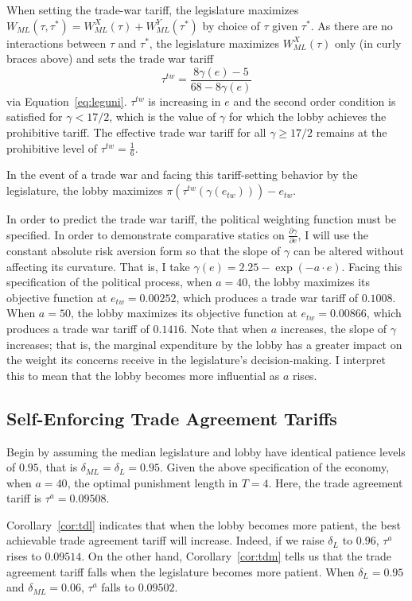 \documentclass[authoryear, review]{elsarticle}
\newcommand{\ga}{\gamma}
\newcommand{\de}{\delta}
\begin{document}
When setting the trade-war tariff, the legislature maximizes $W_{\mathit{ML}}(\tau, \tau^*) = W_{\mathit{ML}}^X(\tau) + W_{\mathit{ML}}^Y(\tau^*)$ by choice of $\tau$ given $\tau^*$. As there are no interactions between $\tau$ and $\tau^*$, the legislature maximizes $W_{\mathit{ML}}^X(\tau)$ only (in curly braces above) and sets the trade war tariff
\[
  \tau^{tw} = \frac{8\ga(e)-5}{68-8\ga(e)}
\]
via Equation~\ref{eq:leguni}. $\tau^{tw}$ is increasing in $e$ and the second order condition is satisfied for $\ga < 17/2$, which is the value of $\ga$ for which the lobby achieves the prohibitive tariff. The effective trade war tariff for all $\ga \geq 17/2$ remains at the prohibitive level of $\tau^{tw} = \frac{1}{6}$.

In the event of a trade war and facing this tariff-setting behavior by the legislature, the lobby maximizes $\pi\left(\tau^{tw}\left(\ga\left(e_{tw}\right)\right)\right) - e_{tw}$.

In order to predict the trade war tariff, the political weighting function must be specified. In order to demonstrate comparative statics on $\frac{\partial \ga}{\partial e}$, I will use the constant absolute risk aversion form so that the slope of $\ga$ can be altered without affecting its curvature. That is, I take $\ga(e) = 2.25 - \exp(-a\cdot e)$. Facing this specification of the political process, when $a=40$, the lobby maximizes its objective function at $e_{tw} = 0.00252$, which produces a trade war tariff of $0.1008$. When $a=50$, the lobby maximizes its objective function at $e_{tw} = 0.00866$, which produces a trade war tariff of $0.1416$. Note that when $a$ increases, the slope of $\ga$ increases; that is, the marginal expenditure by the lobby has a greater impact on the weight its concerns receive in the legislature's decision-making. I interpret this to mean that the lobby becomes more influential as $a$ rises.

\subsection{Self-Enforcing Trade Agreement Tariffs}
Begin by assuming the median legislature and lobby have identical patience levels of $0.95$, that is $\de_{ML} = \de_L = 0.95$. Given the above specification of the economy, when $a=40$, the optimal punishment length in $T=4$. Here, the trade agreement tariff is $\tau^a = 0.09508$.

Corollary~\ref{cor:tdl} indicates that when the lobby becomes more patient, the best achievable trade agreement tariff will increase. Indeed, if we raise $\de_L$ to $0.96$, $\tau^a$ rises to $0.09514$. On the other hand, Corollary~\ref{cor:tdm} tells us that the trade agreement tariff falls when the legislature becomes more patient. When $\de_L = 0.95$ and $\de_{ML} = 0.06$, $\tau^a$ falls to $0.09502$.
\end{document}
